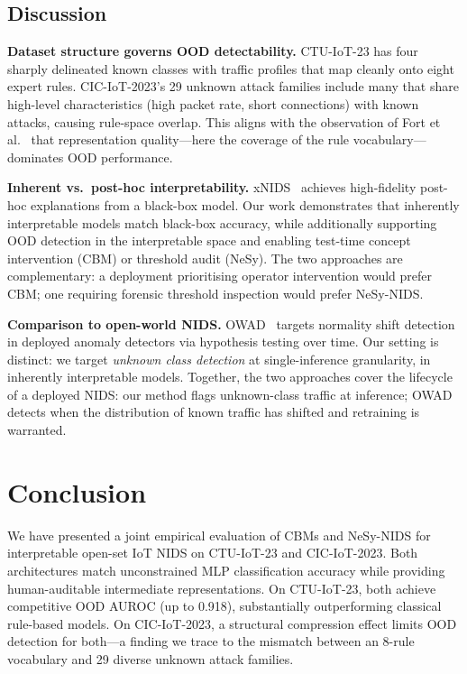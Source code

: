 \documentclass[conference]{IEEEtran}
\begin{document}
\subsection{Discussion}

\textbf{Dataset structure governs OOD detectability.}
CTU-IoT-23 has four sharply delineated known classes with
traffic profiles that map cleanly onto eight expert rules.
CIC-IoT-2023's 29 unknown attack families include many that share
high-level characteristics (high packet rate, short connections) with
known attacks, causing rule-space overlap.
This aligns with the observation of Fort et al.~\cite{fort2021exploring}
that representation quality---here the coverage of the rule vocabulary---
dominates OOD performance.

\textbf{Inherent vs.\ post-hoc interpretability.}
xNIDS~\cite{wei2023xnids} achieves high-fidelity post-hoc explanations
from a black-box model. Our work demonstrates that inherently interpretable
models match black-box accuracy, while additionally supporting OOD
detection in the interpretable space and enabling test-time concept
intervention (CBM) or threshold audit (NeSy).
The two approaches are complementary: a deployment prioritising operator
intervention would prefer CBM; one requiring forensic threshold inspection
would prefer NeSy-NIDS.

\textbf{Comparison to open-world NIDS.}
OWAD~\cite{han2023owad} targets normality shift detection in deployed
anomaly detectors via hypothesis testing over time.
Our setting is distinct: we target \emph{unknown class detection} at
single-inference granularity, in inherently interpretable models.
Together, the two approaches cover the lifecycle of a deployed NIDS:
our method flags unknown-class traffic at inference; OWAD detects when
the distribution of known traffic has shifted and retraining is warranted.

\section{Conclusion}

We have presented a joint empirical evaluation of CBMs and NeSy-NIDS for
interpretable open-set IoT NIDS on CTU-IoT-23 and CIC-IoT-2023.
Both architectures match unconstrained MLP classification accuracy while
providing human-auditable intermediate representations.
On CTU-IoT-23, both achieve competitive OOD AUROC (up to 0.918),
substantially outperforming classical rule-based models.
On CIC-IoT-2023, a structural compression effect limits OOD detection
for both---a finding we trace to the mismatch between an 8-rule vocabulary
and 29 diverse unknown attack families.
\end{document}

